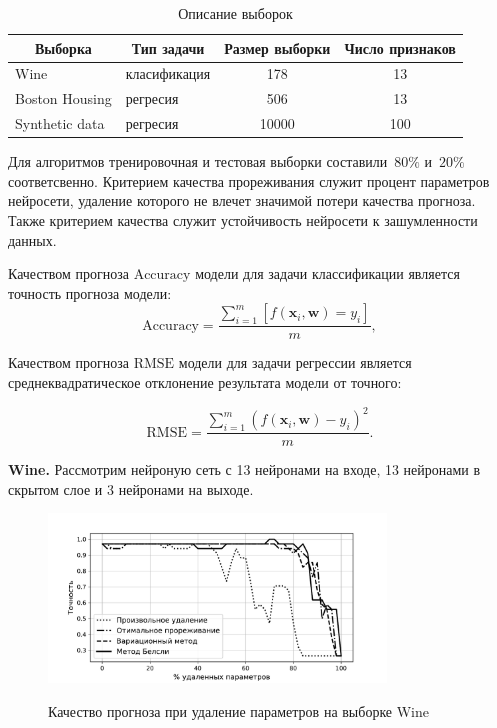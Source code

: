 \begin{table}[h]

\begin{center}
\caption{Описание выборок}
\begin{tabular}{|c|c|c|c|}
\hline
	Выборка &Тип задачи& Размер выборки& Число признаков\\
	\hline
	
	\multicolumn{1}{|l|}{Wine}
	&
	\multicolumn{1}{|l|}{класификация}
	 & 178 & 13\\
	\hline
	
	\multicolumn{1}{|l|}{Boston Housing}
	&
	\multicolumn{1}{|l|}{регресия}
	& 506 & 13\\
	\hline
	
	\multicolumn{1}{|l|}{Synthetic data}
	&
	\multicolumn{1}{|l|}{регресия}
	& 10000 & 100\\
\hline

\end{tabular}
\end{center}
\end{table}



Для алгоритмов тренировочная и тестовая выборки составили~$80\%$ и~$20\%$ соответсвенно. Критерием качества прореживания служит процент параметров нейросети, удаление которого не влечет значимой потери качества прогноза. Также критерием качества служит устойчивость нейросети к зашумленности данных. 

Качеством прогноза $\text{Accuracy}$ модели для задачи классификации является точность прогноза модели:
$$\text{Accuracy} = \frac{\sum_{i=1}^m [f(\textbf{x}_i, \textbf{w}) = y_i]}{m},$$

Качеством прогноза $\text{RMSE}$ модели для задачи регрессии является среднеквадратическое отклонение результата модели от точного:

$$\text{RMSE} = \frac{\sum_{i=1}^m \left(f(\textbf{x}_i, \textbf{w}) - y_i\right)^2}{m}.$$

\textbf{Wine.} Рассмотрим нейроную сеть с 13 нейронами на входе, 13 нейронами в скрытом слое и 3 нейронами на выходе.

\begin{figure}[h!t]\center
\includegraphics[width=0.8\textwidth]{plots/grabovoy/Wine/All.pdf}\\
\caption{Качество прогноза при удаление параметров на выборке Wine}
\label{WineAll}
\end{figure}

